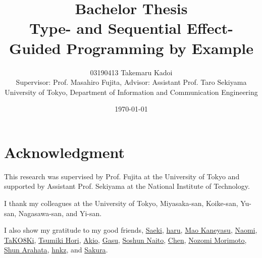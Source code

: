 \documentclass[12pt, a4paper, titlepage]{report}
\title{
  Bachelor Thesis \\
  Type- and Sequential Effect-Guided Programming by Example
}
\author{
  03190413 Takemaru Kadoi
  \\[1cm]
  {\small Supervisor: Prof. Masahiro Fujita},
  {\small Advisor: Assistant Prof. Taro Sekiyama}
  \\[1cm]
  {\small University of Tokyo, Department of Information and Communication Engineering}
}
\date{\today}
\begin{document}



\maketitle
\newpage
\tableofcontents
\newpage

\chapter*{Acknowledgment}
This research was supervised by Prof. Fujita at the University of Tokyo and supported by Assistant Prof. Sekiyama at the National Institute of Technology.

I thank my colleagues at the University of Tokyo, Miyasaka-san, Koike-san, Yu-san, Nagasawa-san, and Yi-san.

I also show my gratitude to my good friends,
  \href{https://twitter.com/97sktk}{Saeki},
  \href{https://twitter.com/9SKEgI72RcOWxB8}{haru},
  \href{https://twitter.com/LdCqh1}{Mao Kaneyasu},
  \href{https://twitter.com/NaomiatLibrary}{Naomi},
  \href{https://twitter.com/TaKOBKi}{TaKO8Ki},
  \href{https://twitter.com/Tmstmput}{Tsumiki Hori},
  \href{https://twitter.com/akio_utsuroido}{Akio},
  \href{https://twitter.com/gasukkkgesu}{Gasu},
  \href{https://twitter.com/hamburg_soshun}{Soshun Naito},
  \href{https://twitter.com/macrokoala}{Chen},
  \href{https://twitter.com/nozo_moto}{Nozomi Morimoto},
  \href{https://twitter.com/readonly_true}{Shun Arahata},
  \href{https://twitter.com/wan__nyan__wan}{hnkz},
  and
  \href{https://twitter.com/cheripori}{Sakura}.

\end{document}
